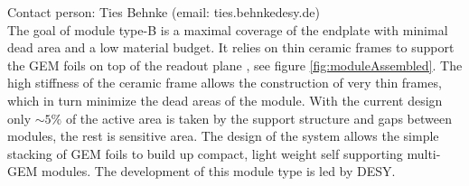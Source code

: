 \label{chap:TPC_sec:DESY_gems}
Contact person: Ties Behnke (email: ties.behnke\@ desy.de)\\

The goal of module type-B is a maximal coverage of the endplate with minimal dead area and a low material budget. It relies on thin ceramic frames to support the GEM foils on top of the readout plane \cite{HallermannPhD,DESYGEM}, see figure \ref{fig:moduleAssembled}. The high stiffness of the ceramic frame allows the construction of very thin frames, which in turn minimize the dead areas of the module. With the current design only $\sim5\%$ of the active area is taken by the support structure and gaps between modules, the rest is sensitive area. The design of the system allows the simple stacking of GEM foils to build up compact, light weight self supporting multi-GEM modules. The development of this module type is led by DESY.

